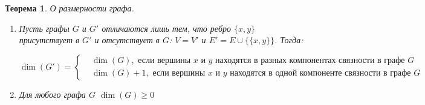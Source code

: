 \documentclass[a4paper,12pt,leqno]{article}
\theoremstyle{plain} %
\newtheorem{theorem}{Теорема}
\theoremstyle{definition} %
\begin{document}
\begin{theorem}\textit{О размерности графа.}

\begin{enumerate}
    \item Пусть графы $G$ и $G'$ отличаются лишь тем, что ребро $\{x, y\}$ присутствует в $G'$ и отсутствует в $G$: $V = V'$ и $E' = E \cup \{\{x, y\}\}$. Тогда:
    
     \begin{equation*}
         \dim(G') =  \left\{
            \begin{aligned}
                & \dim(G), \text{ если вершины } x \text{ и  } y \text{ находятся в разных компонентах связности в графе } G \\
                & \dim(G) + 1, \text{ если вершины } x \text{ и  } y \text{ находятся в одной компоненте связности в графе } G
            \end{aligned}\right.
     \end{equation*}
    
    
    \item Для любого графа $G$ $\dim(G) \geq 0$
\end{enumerate}

\end{theorem}
\end{document}
